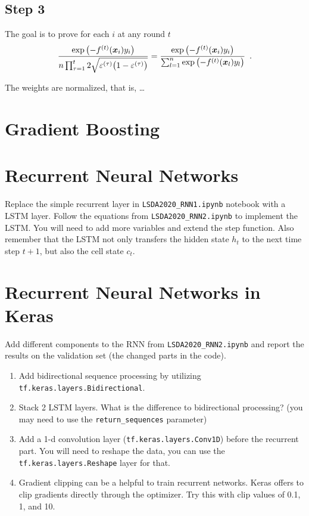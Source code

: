 \documentclass[a4paper,11pt]{article}
\def\vec#1{\mathchoice{\mbox{\boldmath$\displaystyle#1$}}
{\mbox{\boldmath$\textstyle#1$}}
{\mbox{\boldmath$\scriptstyle#1$}}
{\mbox{\boldmath$\scriptscriptstyle#1$}}}
\begin{document}
\subsection{Step 3}
The goal is to prove for each $i$ at any round $t$
\begin{equation}
   \frac{\exp\left(-f^{(t)}(\vec x_i) y_i
    \right)}{\tsize \prod_{\tau=1}^{t}2\sqrt{ \varepsilon^{(\tau)}
      \big(1-\varepsilon^{(\tau)} \big)}}
=   \frac{\exp\left(-f^{(t)}(\vec x_i) y_i
    \right)}{\sum_{l=1}^{n}  \exp\left(-f^{(t)}(\vec x_l) y_l
    \right)  }\enspace.
\end{equation}

The weights are normalized, that is, \dots


\section{Gradient Boosting}


\section{Recurrent Neural Networks}
Replace the simple recurrent layer in \texttt{LSDA2020\_RNN1.ipynb} notebook with a LSTM layer. 
Follow the equations from \texttt{LSDA2020\_RNN2.ipynb} to implement the LSTM. 
You will need to add more variables and extend the step function. 
Also remember that the LSTM not only transfers the hidden state $h_t$ to the next time step $t+1$, but also the cell state $c_t$.

\section{Recurrent Neural Networks in Keras}
Add different components to the RNN from \texttt{LSDA2020\_RNN2.ipynb} and report the results on the validation set (the changed parts in the code).
\begin{enumerate}
    \item Add bidirectional sequence processing by utilizing \texttt{tf.keras.layers.Bidirectional}.
    \item Stack 2 LSTM layers. What is the difference to bidirectional processing? (you may need to use the \texttt{return\_sequences} parameter)
    \item Add a 1-d convolution layer (\texttt{tf.keras.layers.Conv1D}) before the recurrent part. You will need to reshape the data, you can use the \texttt{tf.keras.layers.Reshape} layer for that.
    \item Gradient clipping can be a helpful to train recurrent networks. Keras offers to clip gradients directly through the optimizer. Try this with clip values of 0.1, 1, and 10.
\end{enumerate}



\end{document}
